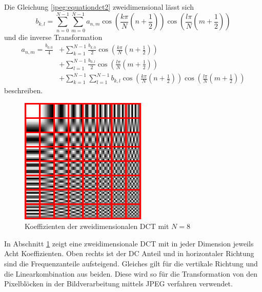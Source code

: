 Die Gleichung \eqref{jpeg:equationdct2} zweidimensional lässt sich
\begin{equation}
    b_{k,l}
    =
    \sum \limits_{n=0}^{N-1} 
    \sum \limits_{m=0}^{N-1} a_{n,m} 
    \cos\left(
    \frac{k\pi}{N}\left(n + \frac{1}{2} \right) 
    \right)
    \cos\left(
    \frac{l\pi}{N}\left(m + \frac{1}{2} \right) 
    \right)
    \label{jpeg:equationdct2dim2}
\end{equation}
und die inverse Transformation  
\begin{align*}
    a_{n,m}
    =
    \frac{b_{0,0}}{4} &+
    \sum \limits_{k=1}^{N-1} 
    \frac{b_{k,0}}{2} 
    \cos\left(
    \frac{k\pi}{N}\left(n + \frac{1}{2} \right) 
    \right) \\ &+
    \sum \limits_{l=1}^{N-1} 
    \frac{b_{0,l}}{2} 
    \cos\left(
    \frac{l\pi}{N}\left(m + \frac{1}{2} \right) 
    \right) \\ &+
    \sum \limits_{k=1}^{N-1} 
    \sum \limits_{l=1}^{N-1} b_{k,l} 
    \cos\left(
    \frac{k\pi}{N}\left(n + \frac{1}{2} \right) 
    \right)
    \cos\left(
    \frac{l\pi}{N}\left(m + \frac{1}{2} \right) 
    \right)
    \label{jpeg:equationdct3dim2}
\end{align*}
beschreiben.

\begin{figure}
    \centering
    \includegraphics[width=60mm]{papers/jpeg/pictures/dctjpeg.pdf}
    \caption{Koeffizienten der zweidimensionalen DCT mit \(N=8\)
        \label{jpeg:fig:dctkoeff}}
\end{figure}

In Abschnitt \ref{jpeg:fig:dctkoeff}  zeigt eine zweidimensionale DCT mit in jeder Dimension jeweils Acht Koeffizienten.
Oben rechts ist der DC Anteil und in horizontaler Richtung sind die Frequenzanteile aufsteigend.
Gleiches gilt für die vertikale Richtung und die Linearkombination aus beiden.
Diese wird so für die Transformation von den Pixelblöcken in der Bildverarbeitung mittels JPEG verfahren verwendet.

